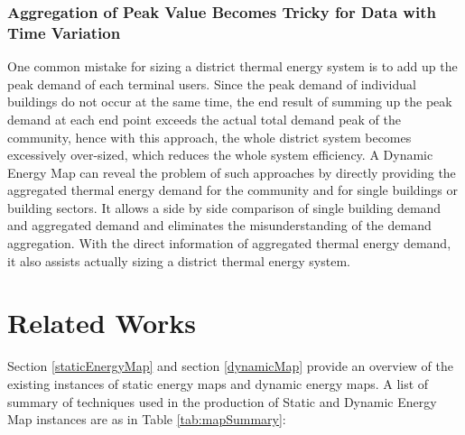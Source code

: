 \documentclass[hidelinks,12pt]{article}
\newcommand{\grey}[1]{\textcolor{black!30}{#1}}
\newcommand{\tref}[1]{Table \ref{#1}}
\begin{document}
\subsubsection{Aggregation of Peak Value Becomes Tricky for Data with Time Variation}
One common mistake for sizing a district thermal energy system is to
add up the peak demand of each terminal users. Since the peak demand
of individual buildings do not occur at the same time, the end result
of summing up the peak demand at each end point exceeds the actual
total demand peak of the community, hence with this approach, the
whole district system becomes excessively over-sized, which reduces
the whole system efficiency. A Dynamic Energy Map can reveal the
problem of such approaches by directly providing the aggregated
thermal energy demand for the community and for single buildings or
building sectors. It allows a side by side comparison of single
building demand and aggregated demand and eliminates the
misunderstanding of the demand aggregation. With the direct
information of aggregated thermal energy demand, it also assists
actually sizing a district thermal energy system.

\newpage
\section{Related Works}
Section \ref{staticEnergyMap} and section \ref{dynamicMap} provide an
overview of the existing instances of static energy maps and dynamic
energy maps. A list of summary of techniques used in the production of
Static and Dynamic Energy Map instances are as in
\tref{tab:mapSummary}:

\begin{comment}
Section \ref{mapDesign} and \ref{stDataAnalysis} provides
some supporting evidences for certain design choices. Section
\ref{4dMap} provides some information on potential technologies for
further development. \grey{(?? are not written)}
\end{comment}
\end{document}
